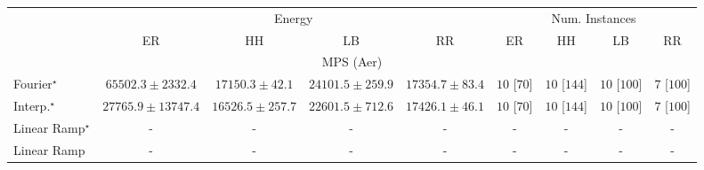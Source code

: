 \begin{tabular}{l|cccc|cccc|}
\toprule
& \multicolumn{4}{c|}{Energy} & \multicolumn{4}{c|}{Num. Instances} \\
            & ER & HH & LB & RR & ER & HH & LB & RR \\
\midrule
\multicolumn{9}{c}{\rule{0pt}{8pt}MPS (Aer)} \\
\midrule
Fourier$^\star$ & {\cellcolor[HTML]{863293}} \color[HTML]{F1F1F1} $65502.3\pm 2332.4$ & {\cellcolor[HTML]{EDF5F9}} \color[HTML]{000000} $17150.3\pm 42.1$ & {\cellcolor[HTML]{D7E5F0}} \color[HTML]{000000} $24101.5\pm 259.9$ & {\cellcolor[HTML]{ECF4F9}} \color[HTML]{000000} $17354.7\pm 83.4$ & {\cellcolor[HTML]{49006A}} \color[HTML]{F1F1F1} $10$ [$70$] & {\cellcolor[HTML]{49006A}} \color[HTML]{F1F1F1} $10$ [$144$] & {\cellcolor[HTML]{49006A}} \color[HTML]{F1F1F1} $10$ [$100$] & {\cellcolor[HTML]{CD238F}} \color[HTML]{F1F1F1} $7$ [$100$] \\
Interp.$^\star$ & {\cellcolor[HTML]{C8DAEA}} \color[HTML]{000000} $27765.9\pm 13747.4$ & {\cellcolor[HTML]{EEF6FA}} \color[HTML]{000000} $16526.5\pm 257.7$ & {\cellcolor[HTML]{DDEAF3}} \color[HTML]{000000} $22601.5\pm 712.6$ & {\cellcolor[HTML]{ECF4F9}} \color[HTML]{000000} $17426.1\pm 46.1$ & {\cellcolor[HTML]{49006A}} \color[HTML]{F1F1F1} $10$ [$70$] & {\cellcolor[HTML]{49006A}} \color[HTML]{F1F1F1} $10$ [$144$] & {\cellcolor[HTML]{49006A}} \color[HTML]{F1F1F1} $10$ [$100$] & {\cellcolor[HTML]{CD238F}} \color[HTML]{F1F1F1} $7$ [$100$] \\
Linear Ramp$^\star$ & {\cellcolor[HTML]{000000}} \color[HTML]{F1F1F1} {\cellcolor{white}} \color{black} - & {\cellcolor[HTML]{000000}} \color[HTML]{F1F1F1} {\cellcolor{white}} \color{black} - & {\cellcolor[HTML]{000000}} \color[HTML]{F1F1F1} {\cellcolor{white}} \color{black} - & {\cellcolor[HTML]{000000}} \color[HTML]{F1F1F1} {\cellcolor{white}} \color{black} - & {\cellcolor[HTML]{000000}} \color[HTML]{F1F1F1} {\cellcolor{white}} \color{black} - & {\cellcolor[HTML]{000000}} \color[HTML]{F1F1F1} {\cellcolor{white}} \color{black} - & {\cellcolor[HTML]{000000}} \color[HTML]{F1F1F1} {\cellcolor{white}} \color{black} - & {\cellcolor[HTML]{000000}} \color[HTML]{F1F1F1} {\cellcolor{white}} \color{black} - \\
Linear Ramp & {\cellcolor[HTML]{000000}} \color[HTML]{F1F1F1} {\cellcolor{white}} \color{black} - & {\cellcolor[HTML]{000000}} \color[HTML]{F1F1F1} {\cellcolor{white}} \color{black} - & {\cellcolor[HTML]{000000}} \color[HTML]{F1F1F1} {\cellcolor{white}} \color{black} - & {\cellcolor[HTML]{000000}} \color[HTML]{F1F1F1} {\cellcolor{white}} \color{black} - & {\cellcolor[HTML]{000000}} \color[HTML]{F1F1F1} {\cellcolor{white}} \color{black} - & {\cellcolor[HTML]{000000}} \color[HTML]{F1F1F1} {\cellcolor{white}} \color{black} - & {\cellcolor[HTML]{000000}} \color[HTML]{F1F1F1} {\cellcolor{white}} \color{black} - & {\cellcolor[HTML]{000000}} \color[HTML]{F1F1F1} {\cellcolor{white}} \color{black} - \\

\end{tabular}

